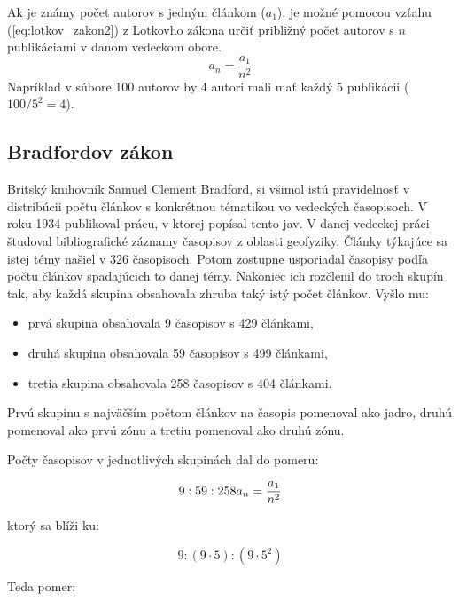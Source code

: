 Ak je známy počet autorov s jedným článkom ($a_1$), je možné pomocou vzťahu
(\ref{eq:lotkov_zakon2}) z Lotkovho zákona určiť približný počet autorov s $n$
publikáciami v danom vedeckom obore.
\begin{equation}
\label{eq:lotkov_zakon2}
a_n = \frac{a_1}{n^2}
\end{equation}
Napríklad v súbore 100 autorov by 4 autori mali mať každý 5 publikácii
($100/5^2 = 4$).


\subsection{Bradfordov zákon}

Britský knihovník Samuel Clement Bradford, si všimol istú pravidelnosť v
distribúcii počtu článkov s konkrétnou tématikou vo vedeckých časopisoch.  V
roku 1934 publikoval prácu, v ktorej popísal tento jav.  V danej vedeckej práci
študoval bibliografické záznamy časopisov z oblasti geofyziky.  Články týkajúce
sa istej témy našiel v 326 časopisoch.  Potom zostupne usporiadal časopisy podľa
počtu článkov spadajúcich to danej témy.  Nakoniec ich rozčlenil do troch skupín
tak, aby každá skupina obsahovala zhruba taký istý počet článkov.  Vyšlo mu:

\begin{itemize}
\item prvá skupina obsahovala 9 časopisov s 429 článkami,
\item druhá skupina obsahovala 59 časopisov s 499 článkami,
\item tretia skupina obsahovala 258 časopisov s 404 článkami.
\end{itemize}

Prvú skupinu s najväčším počtom článkov na časopis pomenoval ako jadro, druhú
pomenoval ako prvú zónu a tretiu pomenoval ako druhú zónu.

Počty časopisov v jednotlivých skupinách dal do pomeru:

\begin{equation}
\label{eq:bradfordov_zakon1}
9 : 59 : 258 \\
a_n = \frac{a_1}{n^2}
\end{equation}

ktorý sa blíži ku:

\begin{equation}
\label{eq:bradfordov_zakon2}
9 : (9 \cdot 5) : (9 \cdot 5^2)
\end{equation}

Teda pomer:

